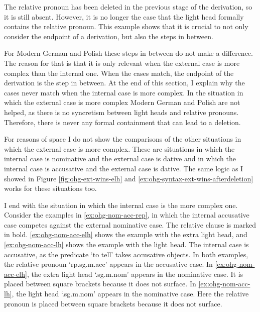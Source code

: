 The relative pronoun has been deleted in the previous stage of the derivation, so it is still absent. However, it is no longer the case that the light head formally contains the relative pronoun. This example shows that it is crucial to not only consider the endpoint of a derivation, but also the steps in between.

For Modern German and Polish these steps in between do not make a difference. The reason for that is that it is only relevant when the external case is more complex than the internal one. When the cases match, the endpoint of the derivation is the step in between. At the end of this section, I explain why the cases never match when the internal case is more complex. In the situation in which the external case is more complex Modern German and Polish are not helped, as there is no syncretism between light heads and relative pronouns. Therefore, there is never any formal containment that can lead to a deletion.

For reasons of space I do not show the comparisons of the other situations in which the external case is more complex. These are situations in which the internal case is nominative and the external case is dative and in which the internal case is accusative and the external case is dative. The same logic as I showed in Figure \ref{fig:ohg-ext-wins-elh} and \ref{ex:ohg-syntax-ext-wins-afterdeletion} works for these situations too.

I end with the situation in which the internal case is the more complex one.
Consider the examples in \ref{ex:ohg-nom-acc-rep}, in which the internal accusative case competes against the external nominative case. The relative clause is marked in bold. \ref{ex:ohg-nom-acc-elh} shows the example with the extra light head, and \ref{ex:ohg-nom-acc-lh} shows the example with the light head.
The internal case is accusative, as the predicate  `to tell' takes accusative objects.
In both examples, the relative pronoun  `\ac{rp}.\ac{sg}.\ac{m}.\ac{acc}' appears in the accusative case.
In \ref{ex:ohg-nom-acc-elh}, the extra light head  `.\ac{sg}.\ac{m}.\ac{nom}' appears in the nominative case. It is placed between square brackets because it does not surface.
In \ref{ex:ohg-nom-acc-lh}, the light head  `.\ac{sg}.\ac{m}.\ac{nom}' appears in the nominative case. Here the relative pronoun is placed between square brackets because it does not surface.

